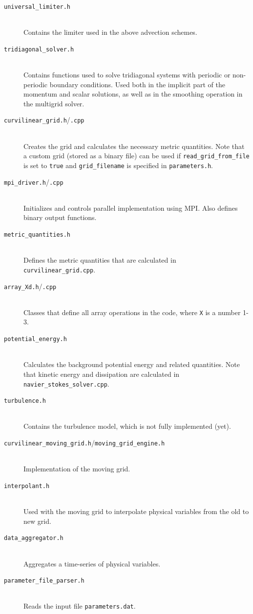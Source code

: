 \documentclass[12pt]{report}
\begin{document}
\begin{description}
\item[\texttt{universal\_limiter.h}] \hfill \\Contains the limiter used in the above advection schemes.
\item[\texttt{tridiagonal\_solver.h}] \hfill \\Contains functions used to solve tridiagonal systems with periodic or non-periodic boundary conditions. Used both in the implicit part of the momentum and scalar solutions, as well as in the smoothing operation in the multigrid solver.
\item[\texttt{curvilinear\_grid.h}/\texttt{.cpp}] \hfill \\Creates the grid and calculates the necessary metric quantities. Note that a custom grid (stored as a binary file) can be used if \texttt{read\_grid\_from\_file} is set to \texttt{true} and \texttt{grid\_filename} is specified in \texttt{parameters.h}.
\item[\texttt{mpi\_driver.h}/\texttt{.cpp}] \hfill \\Initializes and controls parallel implementation using MPI. Also defines binary output functions.
\item[\texttt{metric\_quantities.h}] \hfill \\Defines the metric quantities that are calculated in \texttt{curvilinear\_grid.cpp}.
\item[\texttt{array\_Xd.h}/\texttt{.cpp}] \hfill \\Classes that define all array operations in the code, where \texttt{X} is a number 1-3.
\item[\texttt{potential\_energy.h}] \hfill \\Calculates the background potential energy and related quantities. Note that kinetic energy and dissipation are calculated in \texttt{navier\_stokes\_solver.cpp}.
\item[\texttt{turbulence.h}] \hfill \\Contains the turbulence model, which is not fully implemented (yet).
\item[\texttt{curvilinear\_moving\_grid.h}/\texttt{moving\_grid\_engine.h}] \hfill \\Implementation of the moving grid.
\item[\texttt{interpolant.h}] \hfill \\Used with the moving grid to interpolate physical variables from the old to new grid.
\item[\texttt{data\_aggregator.h}] \hfill \\Aggregates a time-series of physical variables.
\item[\texttt{parameter\_file\_parser.h}] \hfill \\Reads the input file \texttt{parameters.dat}.
\end{description}
\end{document}
